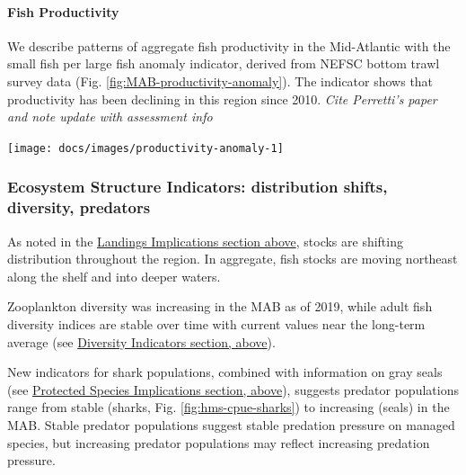 \documentclass[
  10pt,
]{article}
\let\origfigure\figure
\let\endorigfigure\endfigure
\renewenvironment{figure}[1][2] {
    \expandafter\origfigure\expandafter[H]
} {
    \endorigfigure
}
\begin{document}
\hypertarget{fish-productivity}{%
\paragraph{Fish Productivity}\label{fish-productivity}}

We describe patterns of aggregate fish productivity in the Mid-Atlantic
with the small fish per large fish anomaly indicator, derived from NEFSC
bottom trawl survey data (Fig. \ref{fig:MAB-productivity-anomaly}). The
indicator shows that productivity has been declining in this region
since 2010. \emph{Cite Perretti's paper and note update with assessment
info}

\begin{figure}

{\centering \texttt{[image: docs/images/productivity-anomaly-1]} 

}

\caption{Small fish per large fish biomass anomaly in the Mid-Atlantic Bight. The summed anomaly across species is shown by the black line.}\label{fig:productivity-anomaly}
\end{figure}

\hypertarget{ecosystem-structure-indicators-distribution-shifts-diversity-predators}{%
\subsubsection{Ecosystem Structure Indicators: distribution shifts,
diversity,
predators}\label{ecosystem-structure-indicators-distribution-shifts-diversity-predators}}

As noted in the \protect\hyperlink{implications}{Landings Implications
section above}, stocks are shifting distribution throughout the region.
In aggregate, fish stocks are moving northeast along the shelf and into
deeper waters.

Zooplankton diversity was increasing in the MAB as of 2019, while adult
fish diversity indices are stable over time with current values near the
long-term average (see
\protect\hyperlink{ecological-diversity}{Diversity Indicators section,
above}).

New indicators for shark populations, combined with information on gray
seals (see \protect\hyperlink{protected-species}{Protected Species
Implications section, above}), suggests predator populations range from
stable (sharks, Fig. \ref{fig:hms-cpue-sharks}) to increasing (seals) in
the MAB. Stable predator populations suggest stable predation pressure
on managed species, but increasing predator populations may reflect
increasing predation pressure.
\end{document}
